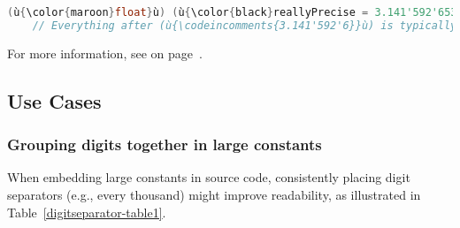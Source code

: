 \begin{lstlisting}[language=C++]
(ù{\color{maroon}float}ù) (ù{\color{black}reallyPrecise = 3.141'592'653'589'793'238'462'643'383'279'502'884;}ù)  // OK
    // Everything after (ù{\codeincomments{3.141'592'6}}ù) is typically ignored silently.
\end{lstlisting}

\noindent For more information, see {\it{}} on page~\pageref{appendix:-silent-loss-of-precision-in-floating-point-literals}.

\subsection[Use Cases]{Use Cases}\label{use-cases}

\subsubsection[Grouping digits together in large constants]{Grouping digits together in large constants}\label{grouping-digits-together-in-large-constants}

When embedding large constants in source code, consistently placing
digit separators (e.g., every thousand) might improve readability, as
illustrated in Table~\ref{digitseparator-table1}.

